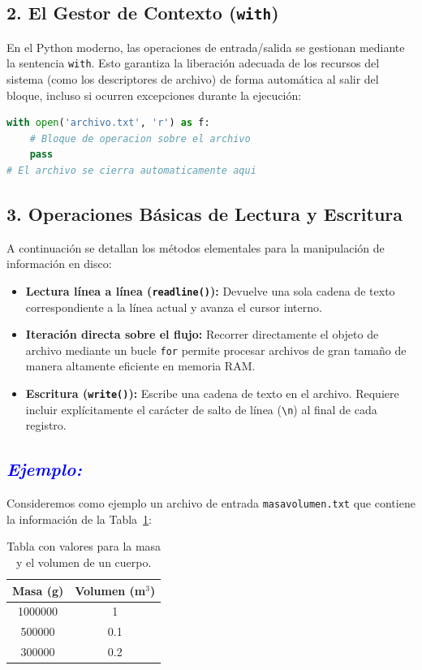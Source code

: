\documentclass[12pt]{article}
\begin{document}
\subsection*{2. El Gestor de Contexto (\texttt{with})}

En el Python moderno, las operaciones de entrada/salida se gestionan mediante la 
sentencia \texttt{with}. Esto garantiza la liberación adecuada de los recursos del sistema (como los descriptores de archivo) de forma automática al salir del bloque, incluso si ocurren excepciones durante la ejecución:

\begin{lstlisting}[language=Python]
with open('archivo.txt', 'r') as f:
    # Bloque de operacion sobre el archivo
    pass
# El archivo se cierra automaticamente aqui
\end{lstlisting}

\subsection*{3. Operaciones Básicas de Lectura y Escritura}

A continuación se detallan los métodos elementales para la manipulación de información en disco:

\begin{itemize}
    \item \textbf{Lectura línea a línea (\texttt{readline()}):} Devuelve una sola cadena de texto correspondiente a la línea actual y avanza el cursor interno.
    \item \textbf{Iteración directa sobre el flujo:} Recorrer directamente el objeto de archivo mediante un bucle \texttt{for} permite procesar archivos de gran tamaño de manera altamente eficiente en memoria RAM.
    \item \textbf{Escritura (\texttt{write()}):} Escribe una cadena de texto en el archivo. Requiere incluir explícitamente el carácter de salto de línea (\texttt{\textbackslash n}) al final de cada registro.
\end{itemize}

\subsection*{\textcolor{blue}{\textit{Ejemplo:}}}
Consideremos como ejemplo un archivo de entrada 
\texttt{masavolumen.txt} que contiene la información de la Tabla~\ref{tab:datos_entrada}:

\begin{table}[h!]
\centering
\begin{tabular}{cc}
\toprule
\textbf{Masa (g)} & \textbf{Volumen (m$^3$)} \\
\midrule
1000000 & 1 \\
500000 & 0.1 \\
300000 & 0.2 \\
\bottomrule
\end{tabular}
\caption{Tabla con valores para la masa y el volumen de un cuerpo.}
\label{tab:datos_entrada}
\end{table}
\end{document}

